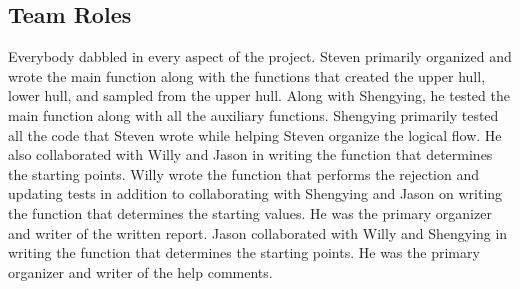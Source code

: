 \documentclass[12pt]{article}
\begin{document}
\subsection*{Team Roles}

Everybody dabbled in every aspect of the project.  Steven primarily organized and wrote the main function along with the functions that created the upper hull, lower hull, and sampled from the upper hull.  Along with Shengying, he tested the main function along with all the auxiliary functions.  Shengying primarily tested all the code that Steven wrote while helping Steven organize the logical flow.  He also collaborated with Willy and Jason in writing the function that determines the starting points.  Willy wrote the function that performs the rejection and updating tests in addition to collaborating with Shengying and Jason on writing the function that determines the starting values.  He was the primary organizer and writer of the written report.  Jason collaborated with Willy and Shengying in writing the function that determines the starting points.  He was the primary organizer and writer of the help comments.
\end{document}
